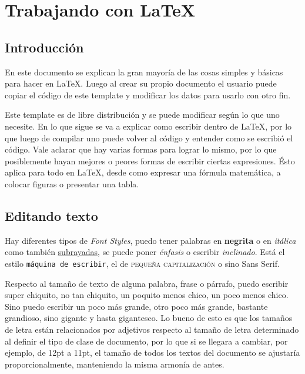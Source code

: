 \documentclass[a4paper,12pt]{article} %
\begin{document}
\thispagestyle{empty} %
\newpage              %


\tableofcontents      %
\thispagestyle{empty} %
\newpage              %

\clearpage


\section{Trabajando con \LaTeX}
\subsection{Introducción}
	
	En este documento se explican la gran mayoría de las cosas simples y básicas para hacer en \LaTeX. Luego al crear su propio documento el usuario puede copiar el código de este template y modificar los datos para usarlo con otro fin. 
	
	Este template es de libre distribución y se puede modificar según lo que uno necesite. En lo que sigue se va a explicar como escribir dentro de \LaTeX, por lo que luego de compilar uno puede volver al código y entender como se escribió el código. Vale aclarar que hay varias formas para lograr lo mismo, por lo que posiblemente hayan mejores o peores formas de escribir ciertas expresiones. Ésto aplica para todo en \LaTeX, desde como expresar una fórmula matemática, a colocar figuras o presentar una tabla.

\subsection{Editando texto}
	Hay diferentes tipos de \textit{Font Styles}, puedo tener palabras en \textbf{negrita} o en \textit{itálica} como también \underline{subrayadas}, se puede poner \emph{énfasis} o escribir \textsl{inclinado}. Está el estilo \texttt{máquina de escribir}, el de \textsc{pequeña capitalización} o sino \textsf{Sans Serif}.
	
	Respecto al tamaño de texto de alguna palabra, frase o párrafo, puedo escribir {\tiny super chiquito}, no tan {\scriptsize chiquito}, un poquito menos {\footnotesize chico}, un poco menos {\small chico}. Sino puedo escribir un poco más {\large grande}, otro poco más {\Large grande}, bastante {\LARGE grandioso}, sino {\huge gigante } y hasta {\Huge gigantesco}. Lo bueno de esto es que los tamaños de letra están relacionados por adjetivos respecto al tamaño de letra determinado al definir el tipo de clase de documento, por lo que si se llegara a cambiar, por ejemplo, de 12pt a 11pt, el tamaño de todos los textos del documento se ajustaría proporcionalmente, manteniendo la misma armonía de antes.
	
\end{document}
